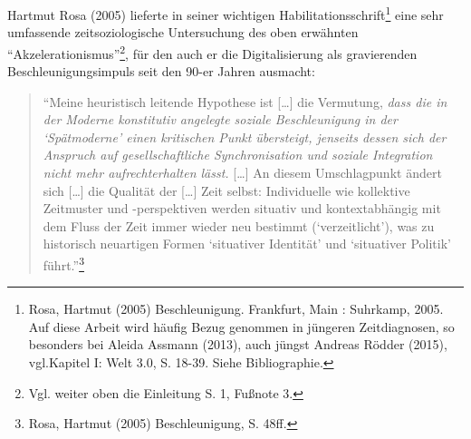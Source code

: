\documentclass[a4paper,
fontsize=11pt,
oneside,
numbers=noperiodatend,
parskip=half-,
bibliography=totoc,
final
]{scrartcl}
\begin{document}
Hartmut Rosa (2005) lieferte in seiner wichtigen
Habilitationsschrift\footnote{Rosa, Hartmut (2005) Beschleunigung.
  Frankfurt, Main : Suhrkamp, 2005. Auf diese Arbeit wird häufig Bezug
  genommen in jüngeren Zeitdiagnosen, so besonders bei Aleida Assmann
  (2013), auch jüngst Andreas Rödder (2015), vgl.Kapitel I: Welt 3.0, S.
  18-39. Siehe Bibliographie.} eine sehr umfassende zeitsoziologische
Untersuchung des oben erwähnten \enquote{Akzelerationismus}\footnote{Vgl.
  weiter oben die Einleitung S. 1, Fußnote 3.}, für den auch er die
Digitalisierung als gravierenden Beschleunigungsimpuls seit den 90-er
Jahren ausmacht:

\begin{quote}
\enquote{Meine heuristisch leitende Hypothese ist {[}\ldots{}{]} die
Vermutung, \emph{dass die in der Moderne konstitutiv angelegte soziale
Beschleunigung in der \enquote{Spätmoderne} einen kritischen Punkt
übersteigt, jenseits dessen sich der Anspruch auf gesellschaftliche
Synchronisation und soziale Integration nicht mehr aufrechterhalten
lässt.} {[}\ldots{}{]} An diesem Umschlagpunkt ändert sich
{[}\ldots{}{]} die Qualität der {[}\ldots{}{]} Zeit selbst: Individuelle
wie kollektive Zeitmuster und -perspektiven werden situativ und
kontextabhängig mit dem Fluss der Zeit immer wieder neu bestimmt
(\enquote{verzeitlicht}), was zu historisch neuartigen Formen
\enquote{situativer Identität} und \enquote{situativer Politik}
führt.}\footnote{Rosa, Hartmut (2005) Beschleunigung, S. 48ff.}
\end{quote}
\end{document}
